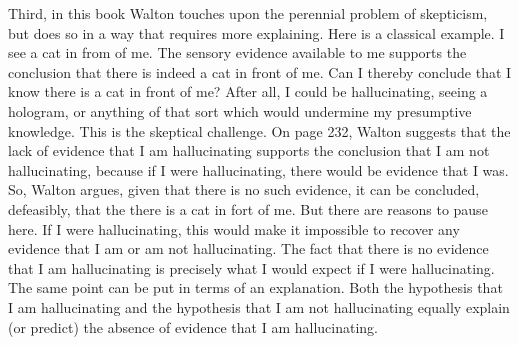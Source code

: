 \documentclass[12pt]{article}
\begin{document}
Third, in this book Walton touches upon the 
perennial problem of skepticism, but does so in a way that requires 
more explaining. Here is a classical example. 
I see a cat in from of me. The sensory evidence available to me supports 
the conclusion that there is indeed a cat in front of me. 
Can I thereby conclude that I know there is a cat in front of me?
After all, I could be hallucinating, seeing a hologram, or anything of 
that sort which would undermine my presumptive knowledge. This is the skeptical challenge.
On page 232, %
Walton suggests that the lack of evidence that I am hallucinating supports the conclusion
that I am not hallucinating, because if I were hallucinating, there would be
evidence that I was. So, Walton argues, given that there is no such
evidence, it can be concluded, defeasibly, that the 
there is a cat in fort of me.  
But there are reasons to pause here. If I were hallucinating, this would make 
it impossible to recover any evidence that I am or am not hallucinating. The fact that there is no
evidence that I am hallucinating is precisely what I would expect if I
were hallucinating. The same point can be put in terms of an explanation. 
Both the hypothesis that I am hallucinating and the hypothesis that I am not hallucinating 
equally explain (or predict) the absence of evidence that I am hallucinating.
\end{document}

